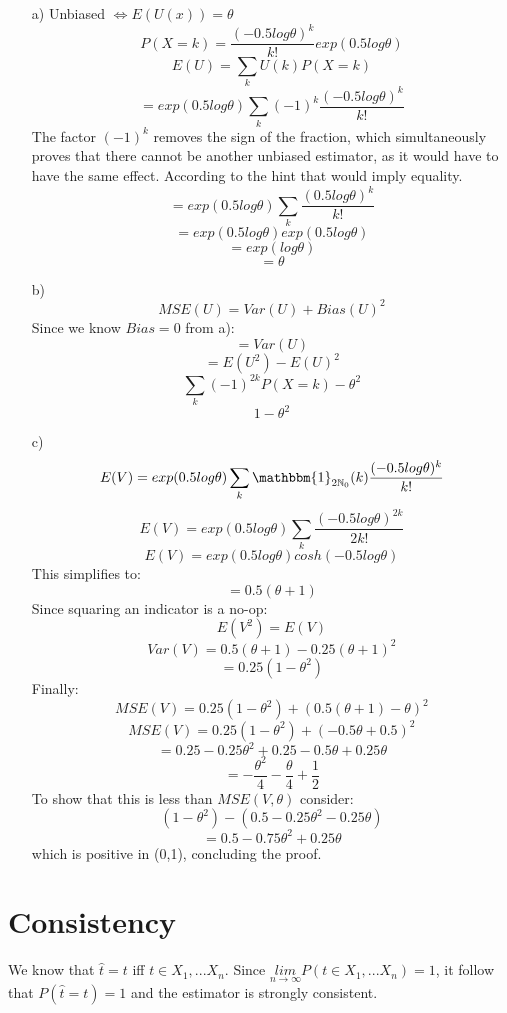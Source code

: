 \documentclass[10pt]{article}
\numberwithin{equation}{section}
\begin{document}
\begin{enumerate}
\item[a)]{
    Unbiased $\Leftrightarrow E(U(x)) = \theta$
    $$P(X=k) = \frac{(-0.5 log \theta)^k}{k!} exp(0.5 log \theta)$$
    $$E(U) = \sum_k U(k)P(X=k)$$
    $$ = exp(0.5 log \theta) \sum_k (-1)^k \frac{(-0.5 log \theta)^k}{k!}$$
    The factor $(-1)^k$ removes the sign of the fraction, which simultaneously proves that there cannot be another unbiased estimator, as it would have to have the same effect. According to the hint that would imply equality.
    $$ = exp(0.5 log \theta) \sum_k \frac{(0.5 log \theta)^k}{k!}$$
    $$ = exp(0.5 log \theta) exp(0.5 log \theta) $$
    $$ = exp(log \theta)$$
    $$ = \theta$$
}
\item[b)]{
    $$ MSE(U) = Var(U) + Bias(U)^2$$
    Since we know $Bias = 0$ from a):
    $$= Var(U)$$
    $$= E(U^2) - E(U)^2$$
    $$\sum_k (-1)^{2k} P(X=k) - \theta^2$$
    $$ 1 - \theta^2$$
}
\item[c)]{
    $$E(V) = exp(0.5log\theta) \sum_k \mathbbm{1}_{2\mathbb{N}_0}(k) \frac{(-0.5log\theta)^k}{k!}$$
    $$E(V) = exp(0.5log\theta) \sum_k \frac{(-0.5log\theta)^{2k}}{2k!}$$
    $$E(V) = exp(0.5log\theta) cosh(-0.5log\theta)$$
    This simplifies to:
    $$= 0.5(\theta + 1)$$
    Since squaring an indicator is a no-op:
    $$E(V^2) = E(V)$$
    $$Var(V) = 0.5(\theta +1) - 0.25(\theta+1)^2$$
    $$= 0.25(1-\theta^2)$$
    Finally:
    $$MSE(V) = 0.25(1-\theta^2) + (0.5(\theta + 1) - \theta)^2$$
    $$MSE(V) = 0.25(1-\theta^2) + (-0.5\theta + 0.5)^2$$
    $$= 0.25-0.25\theta^2 + 0.25-0.5\theta+0.25\theta$$
    $$= -\frac{\theta^2}{4} - \frac{\theta}{4} + \frac{1}{2}$$
    To show that this is less than $MSE(V, \theta)$ consider:
    $$(1-\theta^2) - (0.5-0.25\theta^2-0.25\theta)$$
    $$= 0.5 - 0.75\theta^2 + 0.25\theta$$
    which is positive in (0,1), concluding the proof.
}
\end{enumerate}

\section*{Consistency}
We know that $\hat{t} = t$ iff $t \in X_1, ... X_n$. 
Since $\underset{n\rightarrow \infty}{lim} P(t \in X_1, ... X_n) = 1$, it follow that $P(\hat{t} = t) = 1$ and the estimator is strongly consistent.
\end{document}
